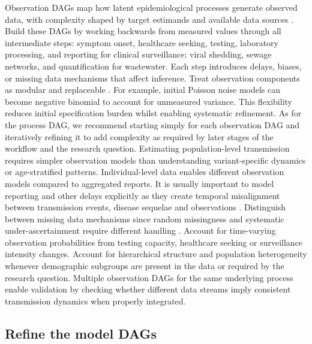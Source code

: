 \documentclass{article}
\begin{document}
Observation DAGs map how latent epidemiological processes generate observed data, with complexity shaped by target estimands and available data sources \citep{deangelis2018analysing}.
Build these DAGs by working backwards from measured values through all intermediate steps: symptom onset, healthcare seeking, testing, laboratory processing, and reporting for clinical surveillance; viral shedding, sewage networks, and quantification for wastewater.
Each step introduces delays, biases, or missing data mechanisms that affect inference.
Treat observation components as modular and replaceable \citep{gelman2020bayesian}. For example, initial Poisson noise models can become negative binomial to account for unmeasured variance.
This flexibility reduces initial specification burden whilst enabling systematic refinement.
As for the process DAG, we recommend starting simply for each observation DAG and iteratively refining it to add complexity as required by later stages of the workflow and the research question.
Estimating population-level transmission requires simpler observation models than understanding variant-specific dynamics or age-stratified patterns.
Individual-level data enables different observation models compared to aggregated reports.
It is usually important to model reporting and other delays explicitly as they create temporal misalignment between transmission events, disease sequelae and observations \citep{seaman2022nowcasting}.
Distinguish between missing data mechanisms since random missingness and systematic under-ascertainment require different handling \citep{sherratt2021exploring}.
Account for time-varying observation probabilities from testing capacity, healthcare seeking or surveillance intensity changes.
Account for hierarchical structure and population heterogeneity whenever demographic subgroups are present in the data or required by the research question.
Multiple observation DAGs for the same underlying process enable validation by checking whether different data streams imply consistent transmission dynamics when properly integrated.

\subsection{Refine the model DAGs} \label{sec:refine-dags}
\end{document}
